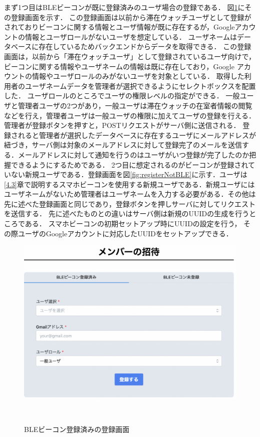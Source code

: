 まず1つ目はBLEビーコンが既に登録済みのユーザ場合の登録である．
図\ref{fig:registerBLE}にその登録画面を示す．
この登録画面は以前から滞在ウォッチユーザとして登録がされておりビーコンに関する情報とユーザ情報が既に存在するが，Googleアカウントの情報とユーザロールがないユーザを想定している．
ユーザネームはデータベースに存在しているためバックエンドからデータを取得できる．
この登録画面は，以前から「滞在ウォッチユーザ」として登録されているユーザ向けで，ビーコンに関する情報やユーザネームの情報は既に存在しており，Google アカウントの情報やユーザロールのみがないユーザを対象としている．
取得した利用者のユーザネームデータを管理者が選択できるようにセレクトボックスを配置した．
ユーザロールのところでユーザの権限レベルの指定ができる．
一般ユーザと管理者ユーザの2つがあり，一般ユーザは滞在ウォッチの在室者情報の閲覧などを行え，管理者ユーザは一般ユーザの権限に加えてユーザの登録を行える．
管理者が登録ボタンを押すと，POSTリクエストがサーバ側に送信される．
登録されると管理者が選択したデータベースに存在するユーザにメールアドレスが紐づき，サーバ側は対象のメールアドレスに対して登録完了のメールを送信する．メールアドレスに対して通知を行うのはユーザがいつ登録が完了したのか把握できるようにするためである．
2つ目に想定されるのがビーコンが登録されていない新規ユーザである．登録画面を図\ref{fig:registerNotBLE}に示す．ユーザは\ref{4.3}章で説明するスマホビーコンを使用する新規ユーザである．新規ユーザにはユーザネームがないため管理者はユーザネームを入力する必要がある．その他は先に述べた登録画面と同じであり，登録ボタンを押しサーバに対してリクエストを送信する．
先に述べたものとの違いはサーバ側は新規のUUIDの生成を行うところである．
スマホビーコンの初期セットアップ時にUUIDの設定を行う，
その際ユーザのGoogleアカウントに対応したUUIDをセットアップできる．


\begin{figure}[tbh]
  \centering
  \includegraphics[width=16cm]{image/registerBLE.png}
  \caption{BLEビーコン登録済みの登録画面}　\label{fig:registerBLE}

\end{figure}

